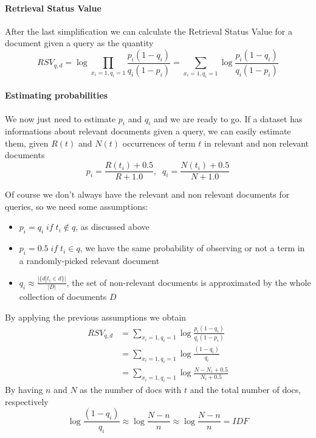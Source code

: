 \paragraph{Retrieval Status Value}
After the last simplification we can calculate the Retrieval Status Value
for a document given a query as the quantity
$$\mathit{RSV}_{q,d} = \log \prod_{x_i=1, q_i = 1} 
\frac{p_i(1-q_i)}{q_i(1-p_i)} = \sum_{x_i=1, q_i = 1} \log 
\frac{p_i(1-q_i)}{q_i(1-p_i)}$$

\paragraph{Estimating probabilities}
We now just need to estimate $p_i$ and $q_i$ and we are ready to go.
If a dataset has informations about relevant documents given a query, 
we can easily estimate them, given $R(t)$ and $N(t)$ occurrences of term $t$ in 
relevant and non relevant documents
$$p_i = \frac{R(t_i) + 0.5}{R + 1.0}, \;\; q_i = \frac{N(t_i) + 0.5}{N + 1.0}$$

Of course we don't always have the relevant and non relevant documents 
for queries, so we need some assumptions:
\begin{itemize}
    \item $p_i = q_i\;\mathit{if}\; t_i \notin q$, as discussed above
    \item $p_i = 0.5\;\mathit{if}\; t_i \in q$, we have the same probability of 
    observing or not a term in a randomly-picked relevant document
    \item $q_i \approx \frac{ |\{ d | t_i \in d\}| }{ |D| }$, 
    the set of non-relevant documents is approximated by the whole collection 
    of documents $D$
\end{itemize}
By applying the previous assumptions we obtain
\begin{equation}
    \begin{aligned}
        \mathit{RSV}_{q,d} &= \sum_{x_i=1, q_i = 1} \log \frac{p_i(1-q_i)}{q_i(1-p_i)}\\
        &= \sum_{x_i=1, q_i = 1} \log \frac{(1-q_i)}{q_i}\\
        &= \sum_{x_i=1, q_i = 1} \log \frac{N - N_i + 0.5}{N_i + 0.5}
    \end{aligned}
\end{equation}
By having $n$ and $N$ as the number of docs with $t$ and the total 
number of docs, respectively
$$\log \frac{(1-q_i)}{q_i} \approx \log \frac{N-n}{n} \approx \log \frac{N-n}{n} = \mathit{IDF}$$

